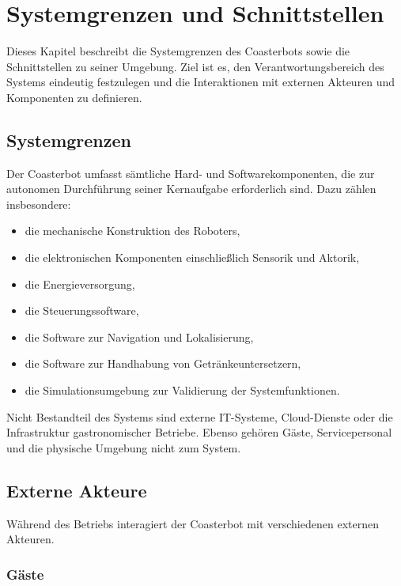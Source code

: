\documentclass[
  a4paper,
  12pt,
  DIV=12,        %
  parskip=half,  %
  headings=small %
]{scrartcl}
\theoremstyle{definition}
\providecommand{\tightlist}{%
  \setlength{\itemsep}{0pt}\setlength{\parskip}{0pt}}
\theoremstyle{definition}
\begin{document}
\section{Systemgrenzen und
Schnittstellen}\label{systemgrenzen-und-schnittstellen}

Dieses Kapitel beschreibt die Systemgrenzen des Coasterbots sowie die
Schnittstellen zu seiner Umgebung. Ziel ist es, den
Verantwortungsbereich des Systems eindeutig festzulegen und die
Interaktionen mit externen Akteuren und Komponenten zu definieren.

\subsection{Systemgrenzen}\label{systemgrenzen}

Der Coasterbot umfasst sämtliche Hard- und Softwarekomponenten, die zur
autonomen Durchführung seiner Kernaufgabe erforderlich sind. Dazu zählen
insbesondere:

\begin{itemize}
\tightlist
\item
  die mechanische Konstruktion des Roboters,
\item
  die elektronischen Komponenten einschließlich Sensorik und Aktorik,
\item
  die Energieversorgung,
\item
  die Steuerungssoftware,
\item
  die Software zur Navigation und Lokalisierung,
\item
  die Software zur Handhabung von Getränkeuntersetzern,
\item
  die Simulationsumgebung zur Validierung der Systemfunktionen.
\end{itemize}

Nicht Bestandteil des Systems sind externe IT-Systeme, Cloud-Dienste
oder die Infrastruktur gastronomischer Betriebe. Ebenso gehören Gäste,
Servicepersonal und die physische Umgebung nicht zum System.

\subsection{Externe Akteure}\label{externe-akteure}

Während des Betriebs interagiert der Coasterbot mit verschiedenen
externen Akteuren.

\subsubsection{Gäste}\label{guxe4ste-1}
\end{document}
